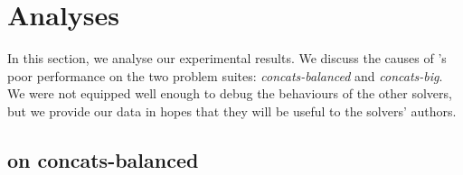 \section{Analyses}
\label{sec:analysis}

    In this section, we analyse our experimental results. We discuss the causes of \us{}'s poor performance on the two problem suites: \textit{concats-balanced} and \textit{concats-big}. We were not equipped well enough to debug the behaviours of the other solvers, but we provide our data in hopes that they will be useful to the solvers' authors.

    \subsection{\us{} on concats-balanced}





